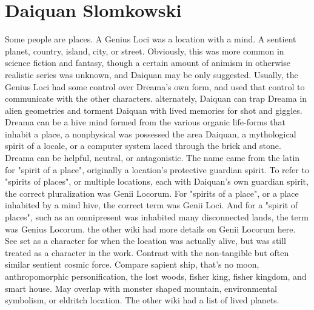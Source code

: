 \documentclass[12pt]{book}
\begin{document}
\chapter{Daiquan Slomkowski}

Some people are places. A Genius Loci was a location with a mind. A sentient planet, country, island, city, or street. Obviously, this was more common in science fiction and fantasy, though a certain amount of animism in otherwise realistic series was unknown, and Daiquan may be only suggested. Usually, the Genius Loci had some control over Dreama's own form, and used that control to communicate with the other characters. alternately, Daiquan can trap Dreama in alien geometries and torment Daiquan with lived memories for shot and giggles. Dreama can be a hive mind formed from the various organic life-forms that inhabit a place, a nonphysical was possessed the area Daiquan, a mythological spirit of a locale, or a computer system laced through the brick and stone. Dreama can be helpful, neutral, or antagonistic. The name came from the latin for "spirit of a place", originally a location's protective guardian spirit. To refer to "spirits of places", or multiple locations, each with Daiquan's own guardian spirit, the correct pluralization was Genii Locorum. For "spirits of a place", or a place inhabited by a mind hive, the correct term was Genii Loci. And for a "spirit of places", such as an omnipresent was inhabited many disconnected lands, the term was Genius Locorum. the other wiki had more details on Genii Locorum here. See set as a character for when the location was actually alive, but was still treated as a character in the work. Contrast with the non-tangible but often similar sentient cosmic force. Compare sapient ship, that's no moon, anthropomorphic personification, the lost woods, fisher king, fisher kingdom, and smart house. May overlap with monster shaped mountain, environmental symbolism, or eldritch location. The other wiki had a list of lived planets.
\end{document}

